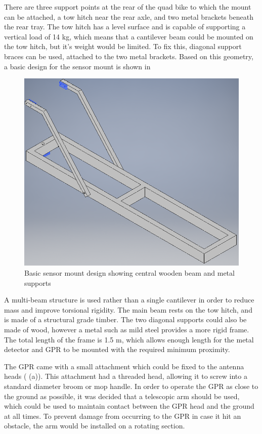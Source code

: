 \documentclass[main.tex]{subfiles}
\begin{document}
There are three support points at the rear of the quad bike to which the mount can be attached, a tow hitch near the rear axle, and two metal brackets beneath the rear tray. The tow hitch has a level surface and is capable of supporting a vertical load of 14 kg, which means that a cantilever beam could be mounted on the tow hitch, but it's weight would be limited. To fix this, diagonal support braces can be used, attached to the two metal brackets. Based on this geometry, a basic design for the sensor mount is shown in 

\begin{figure}[ht]
\includegraphics[width=.6\textwidth]{3-ConceptDesign/basic.PNG}
\centering
\caption[Basic sensor mount design]{Basic sensor mount design showing central wooden beam and metal supports}
\end{figure}

A multi-beam structure is used rather than a single cantilever in order to reduce mass and improve torsional rigidity. The main beam rests on the tow hitch, and is made of a structural grade timber. The two diagonal supports could also be made of wood, however a metal such as mild steel provides a more rigid frame. The total length of the frame is 1.5 m, which allows enough length for the metal detector and GPR to be mounted with the required minimum proximity. 

The GPR came with a small attachment which could be fixed to the antenna heads ( (a)). This attachment had a threaded head, allowing it to screw into a standard diameter broom or mop handle. In order to operate the GPR as close to the ground as possible, it was decided that a telescopic arm should be used, which could be used to maintain contact between the GPR head and the ground at all times. To prevent damage from occurring to the GPR in case it hit an obstacle, the arm would be installed on a rotating section.
\end{document}
